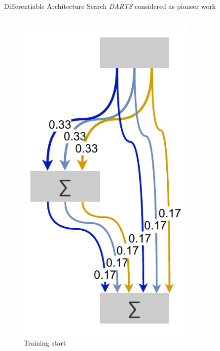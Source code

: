 \documentclass[]{beamer}
\begin{document}
\begin{frame}{Differentiable Architecture Search}
\vspace{10pt}
\textit{DARTS} \cite{Liu2018} considered as pioneer work
\vfill
\begin{columns}
\begin{column}{.35\textwidth}
\begin{figure}
	\includegraphics[scale=0.4, center]{graphics/darts_1.pdf}
	\caption{Training start}
\end{figure}
\end{column}
\begin{column}{.3\textwidth}
\begin{figure}

\end{figure}
\end{column}
\end{columns}
\end{frame}
\end{document}

